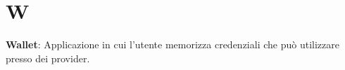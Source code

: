 \section{W}
\textbf{Wallet}: Applicazione in cui l'utente memorizza credenziali che può utilizzare presso dei provider. %